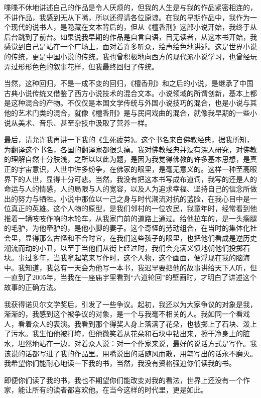 \documentclass[fontset=fandol,12pt,a5paper]{ctexbook}
\begin{document}
喋喋不休地讲述自己的作品是令人厌烦的，但我的人生是与我的作品紧密相连的，不讲作品，我感到无从下嘴，所以还得请各位原谅。在我的早期作品中，我作为一个现代的说书人，是隐藏在文本背后的，但从《檀香刑》这部小说开始，我终于从后台跳到了前台。如果说我早期的作品是自言自语，目无读者，从这本书开始，我感觉到自己是站在一个广场上，面对着许多听众，绘声绘色地讲述。这是世界小说的传统，更是中国小说的传统。我也曾积极地向西方的现代派小说学习，也曾经玩弄过形形色色的叙事花样，但我最终回归了传统。

当然，这种回归，不是一成不变的回归，《檀香刑》和之后的小说，是继承了中国古典小说传统又借鉴了西方小说技术的混合文本。小说领域的所谓创新，基本上都是这种混合的产物。不仅仅是本国文学传统与外国小说技巧的混合，也是小说与其他的艺术门类的混合，就像《檀香刑》是与民间戏曲的混合，就像我早期的一些小说从美术、音乐、甚至杂技中汲取了营养一样。

最后，请允许我再讲一下我的《生死疲劳》。这个书名来自佛教经典，据我所知，为翻译这个书名，各国的翻译家都很头痛。我对佛教经典并没有深入研究，对佛教的理解自然十分肤浅，之所以以此为题，是因为我觉得佛教的许多基本思想，是真正的宇宙意识，人世中许多纷争，在佛家的眼里，是毫无意义的。这样一种至高眼界下的人世，显得十分可悲。当然，我没有把这本书写成布道词，我写的还是人的命运与人的情感，人的局限与人的宽容，以及人为追求幸福、坚持自己的信念所做出的努力与牺牲。小说中那位以一己之身与时代潮流对抗的蓝脸，在我心目中是一位真正的英雄。这个人物的原型，是我们邻村的一位农民，我童年时，经常看到他推着一辆吱吱作响的木轮车，从我家门前的道路上通过。给他拉车的，是一头瘸腿的毛驴，为他牵驴的，是他小脚的妻子。这个奇怪的劳动组合，在当时的集体化社会里，显得那么古怪和不合时宜，在我们这些孩子的眼里，也把他们看成是逆历史潮流而动的小丑，以至于当他们从街上经过时，我们会充满义愤地朝他们投掷石块。事过多年，当我拿起笔来写作时，这个人物，这个画面，便浮现在我的脑海中。我知道，我总有一天会为他写一本书，我迟早要把他的故事讲给天下人听，但一直到了2005年，当我在一座庙宇里看到“六道轮回”的壁画时，才明白了讲述这个故事的正确方法。

我获得诺贝尔文学奖后，引发了一些争议。起初，我还以为大家争议的对象是我，渐渐的，我感到这个被争议的对象，是一个与我毫不相关的人。我如同一个看戏人，看着众人的表演。我看到那个得奖人身上落满了花朵，也被掷上了石块、泼上了污水。我生怕他被打垮，但他微笑着从花朵和石块中钻出来，擦干净身上的脏水，坦然地站在一边，对着众人说：对一个作家来说，最好的说话方式是写作。我该说的话都写进了我的作品里。用嘴说出的话随风而散，用笔写出的话永不磨灭。我希望你们能耐心地读一下我的书，当然，我没有资格强迫你们读我的书。

即便你们读了我的书，我也不期望你们能改变对我的看法，世界上还没有一个作家，能让所有的读者都喜欢他。在当今这样的时代里，更是如此。
\end{document}
